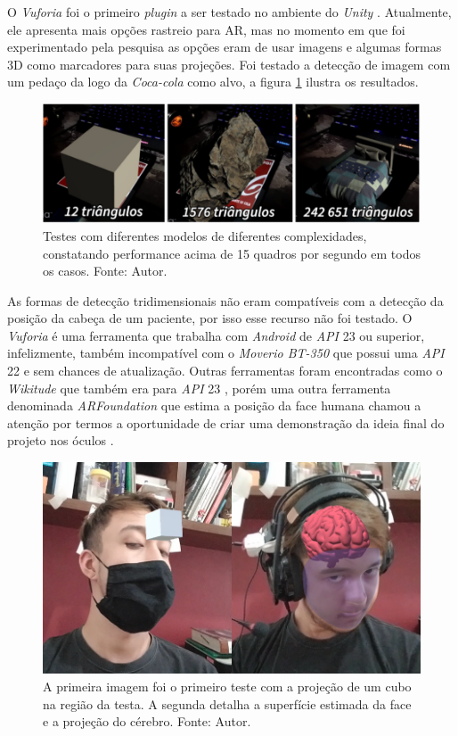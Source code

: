 O \textit{Vuforia} foi o primeiro \textit{plugin} a ser testado no ambiente do \textit{Unity} \cite{Vuforia}. Atualmente, ele apresenta mais opções rastreio para AR, mas no momento em que foi experimentado pela pesquisa as opções eram de usar imagens e algumas formas 3D como marcadores para suas projeções. Foi testado a detecção de imagem com um pedaço da logo da \textit{Coca-cola\texttrademark} como alvo, a figura \ref{fig:vuforia-tests} ilustra os resultados.

\begin{figure}[ht]
    \centering
    \includegraphics[width=.85\linewidth]{figuras/Vuforia.png}
    \caption{Testes com diferentes modelos de diferentes complexidades, constatando performance acima de 15 quadros por segundo em todos os casos. Fonte: Autor.}
    \label{fig:vuforia-tests}
\end{figure}

As formas de detecção tridimensionais não eram compatíveis com a detecção da posição da cabeça de um paciente, por isso esse recurso não foi testado. O \textit{Vuforia} é uma ferramenta que trabalha com \textit{Android} de \textit{API} 23 ou superior, infelizmente, também incompatível com o \textit{Moverio BT-350} que possui uma \textit{API} 22 e sem chances de atualização. Outras ferramentas foram encontradas como o \textit{Wikitude\texttrademark} que também era para \textit{API} 23 \cite{wikitudes}, porém uma outra ferramenta denominada \textit{ARFoundation} que estima a posição da face humana chamou a atenção por termos a oportunidade de criar uma demonstração da ideia final do projeto nos óculos \cite{arfoundation-docs}.

\begin{figure}[ht]
    \centering
    \includegraphics[width=.6\linewidth]{figuras/VCranium.png}
    \caption{A primeira imagem foi o primeiro teste com a projeção de um cubo na região da testa. A segunda detalha a superfície estimada da face e a projeção do cérebro. Fonte: Autor.}
    \label{fig:arfoundation}
\end{figure}

